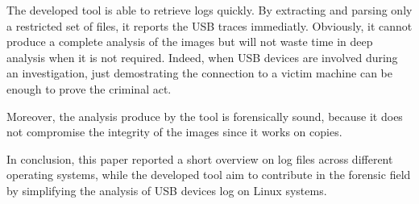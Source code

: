 \documentclass[a4paper]{article}
\begin{document}
The developed tool is able to retrieve logs quickly. By extracting and parsing
only a restricted set of files, it reports the USB traces immediatly. Obviously,
it cannot produce a complete analysis of the images but will not waste time in
deep analysis when it is not required. Indeed, when USB devices are involved
during an investigation, just demostrating the connection to a victim machine
can be enough to prove the criminal act.

Moreover, the analysis produce by the tool is forensically sound, because it
does not compromise the integrity of the images since it works on copies.

In conclusion, this paper reported a short overview on log files across
different operating systems, while the developed tool aim to contribute in the
forensic field by simplifying the analysis of USB devices log on Linux systems.



\end{document}
